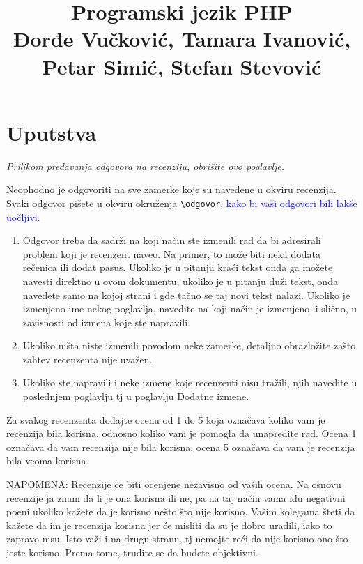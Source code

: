 \documentclass[a4paper]{report}
\newcommand{\odgovor}[1]{\textcolor{blue}{#1}}
\begin{document}
\title{Programski jezik PHP\\ \small{Đorđe Vučković, Tamara Ivanović, \\ Petar Simić, Stefan Stevović}}

\maketitle

\tableofcontents

\chapter{Uputstva}
\emph{Prilikom predavanja odgovora na recenziju, obrišite ovo poglavlje.}

Neophodno je odgovoriti na sve zamerke koje su navedene u okviru recenzija. Svaki odgovor pišete u okviru okruženja \verb"\odgovor", \odgovor{kako bi vaši odgovori bili lakše uočljivi.} 
\begin{enumerate}

\item Odgovor treba da sadrži na koji način ste izmenili rad da bi adresirali problem koji je recenzent naveo. Na primer, to može biti neka dodata rečenica ili dodat pasus. Ukoliko je u pitanju kraći tekst onda ga možete navesti direktno u ovom dokumentu, ukoliko je u pitanju duži tekst, onda navedete samo na kojoj strani i gde tačno se taj novi tekst nalazi. Ukoliko je izmenjeno ime nekog poglavlja, navedite na koji način je izmenjeno, i slično, u zavisnosti od izmena koje ste napravili. 

\item Ukoliko ništa niste izmenili povodom neke zamerke, detaljno obrazložite zašto zahtev recenzenta nije uvažen.

\item Ukoliko ste napravili i neke izmene koje recenzenti nisu tražili, njih navedite u poslednjem poglavlju tj u poglavlju Dodatne izmene.
\end{enumerate}

Za svakog recenzenta dodajte ocenu od 1 do 5 koja označava koliko vam je recenzija bila korisna, odnosno koliko vam je pomogla da unapredite rad. Ocena 1 označava da vam recenzija nije bila korisna, ocena 5 označava da vam je recenzija bila veoma korisna. 

NAPOMENA: Recenzije ce biti ocenjene nezavisno od vaših ocena. Na osnovu recenzije ja znam da li je ona korisna ili ne, pa na taj način vama idu negativni poeni ukoliko kažete da je korisno nešto što nije korisno. Vašim kolegama šteti da kažete da im je recenzija korisna jer će misliti da su je dobro uradili, iako to zapravo nisu. Isto važi i na drugu stranu, tj nemojte reći da nije korisno ono što jeste korisno. Prema tome, trudite se da budete objektivni. 
\end{document}
